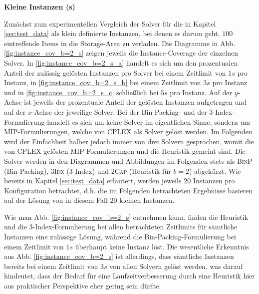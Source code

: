 \textbf{Kleine Instanzen (s)}

Zunächst zum experimentellen Vergleich der Solver für die in Kapitel \ref{sec:test_data} als klein definierte Instanzen,
bei denen es darum geht, $100$ eintreffende Items in die Storage-Area zu verladen.
Die Diagramme in Abb. \ref{fig:instance_cov_b=2_s} zeigen jeweils die Instance-Coverage der einzelnen Solver.
In \ref{fig:instance_cov_b=2_s_a} handelt es sich um den prozentualen Anteil der zulässig gelösten Instanzen pro Solver bei einem Zeitlimit
von $1s$ pro Instanz, in \ref{fig:instance_cov_b=2_s_b} bei einem Zeitlimit von $3s$ pro Instanz und in \ref{fig:instance_cov_b=2_s_c}
schließlich bei $5s$ pro Instanz.\newline
Auf der $y$-Achse ist jeweils der prozentuale Anteil der gelösten Instanzen aufgetragen und auf der $x$-Achse der jeweilige Solver.
Bei der Bin-Packing- und der 3-Index-Formulierung handelt es sich um keine Solver im eigentlichen Sinne,
sondern um MIP-Formulierungen, welche von CPLEX als Solver gelöst werden.
Im Folgenden wird der Einfachheit halber jedoch immer von drei Solvern gesprochen, womit die von
CPLEX gelösten MIP-Formulierungen und die Heuristik gemeint sind.
Die Solver werden in den Diagrammen und Abbildungen im Folgenden stets als \textsc{BinP} (Bin-Packing),
\textsc{3Idx} (3-Index) und \textsc{2Cap} (Heuristik für $b = 2$) abgekürzt.
Wie bereits in Kapitel \ref{sec:test_data} erläutert, werden jeweils $20$ Instanzen pro Konfiguration betrachtet,
d.h. die im Folgenden betrachteten Ergebnisse basieren auf der Lösung von in diesem Fall $20$ kleinen Instanzen.

Wie man Abb. \ref{fig:instance_cov_b=2_s} entnehmen kann, finden die Heuristik und die 3-Index-Formulierung bei allen betrachteten Zeitlimits für sämtliche Instanzen eine zulässige Lösung, während die Bin-Packing-Formulierung bei einem Zeitlimit von $1s$
überhaupt keine Instanz löst.\newline
Die wesentliche Erkenntnis aus Abb. \ref{fig:instance_cov_b=2_s} ist allerdings, dass sämtliche Instanzen bereits bei einem Zeitlimit von $3s$ von allen Solvern gelöst werden, was darauf hindeutet, dass der Bedarf für eine Laufzeitverbesserung durch eine Heuristik hier
aus praktischer Perspektive eher gering sein dürfte.

